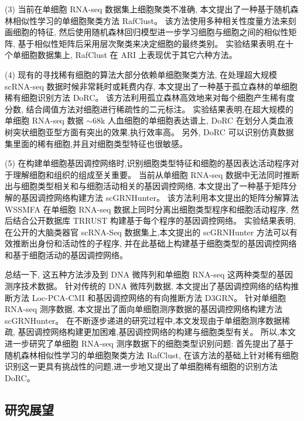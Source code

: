 (3) 当前在单细胞 RNA-seq 数据集上细胞聚类不准确,
本文提出了一种基于随机森林相似性学习的单细胞聚类方法 RafClust。
该方法使用多种相关性度量方法来刻画细胞的特征, 
然后使用随机森林回归模型进一步学习细胞与细胞之间的相似性矩阵,
基于相似性矩阵后采用层次聚类来决定细胞的最终类别。
实验结果表明,在十个单细胞数据集上, RafClust 在 ARI 上表现优于其它六种方法。

(4) 现有的寻找稀有细胞的算法大部分依赖单细胞聚类方法,
在处理超大规模 scRNA-seq 数据时候非常耗时或耗费内存,
本文提出了一种基于孤立森林的单细胞稀有细胞识别方法 DoRC。
该方法利用孤立森林高效地来对每个细胞产生稀有度分数,
结合阈值方法对细胞进行稀疏性的二元标注。
实验结果表明,在超大规模的单细胞 RNA-seq 数据 ${\sim}68$k 人血细胞的单细胞表达谱上,
DoRC 在划分人类血液树突状细胞亚型方面有突出的效果,执行效率高。
另外, DoRC 可以识别仿真数据集里面的稀有细胞,并且对细胞类型特征也很敏感。


(5) 在构建单细胞基因调控网络时,识别细胞类型特征和细胞的基因表达活动程序对于理解细胞和组织的组成至关重要。
当前从单细胞 RNA-seq 数据中无法同时推断出与细胞类型相关和与细胞活动相关的基因调控网络,
本文提出了一种基于矩阵分解的基因调控网络构建方法 scGRNHunter。
该方法利用本文提出的矩阵分解算法 WSSMFA 在单细胞 RNA-seq 数据上同时分离出细胞类型程序和细胞活动程序,
然后结合公开数据库 TRRUST 构建基于每个程序的基因调控网络。
实验结果表明,在公开的大脑类器官 scRNA-Seq 数据集上,本文提出的 scGRNHunter 方法可以有效推断出身份和活动性的子程序, 
并在此基础上构建基于细胞类型的基因调控网络和基于细胞活动的基因调控网络。


总结一下, 这五种方法涉及到 DNA 微阵列和单细胞 RNA-seq 这两种类型的基因测序技术数据。
针对传统的 DNA 微阵列数据, 本文提出了基因调控网络的结构推断方法 Loc-PCA-CMI 和基因调控网络的有向推断方法 D3GRN。
针对单细胞 RNA-seq 测序数据, 本文提出了面向单细胞测序数据的基因调控网络构建方法 scGRNHunter。
在不断逐步递进的研究过程中,本文发现由于单细胞测序数据稀疏, 基因调控网络构建更加困难,基因调控网络的构建与细胞类型有关。
所以,本文进一步研究了单细胞 RNA-seq 测序数据下的细胞类型识别问题: 首先提出了基于随机森林相似性学习的单细胞聚类方法 RafClust, 
在该方法的基础上针对稀有细胞识别这一更具有挑战性的问题,进一步地又提出了单细胞稀有细胞的识别方法 DoRC。

\subsection{研究展望}

